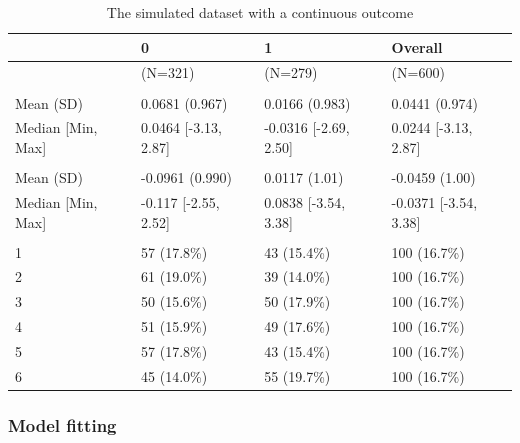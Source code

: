 \documentclass[
  letterpaper,
  DIV=11,
  numbers=noendperiod]{scrreprt}
\begin{document}
\hypertarget{tbl-summary-continuous_outcome-data}{}
\begin{table}
\caption{\label{tbl-summary-continuous_outcome-data}The simulated dataset with a continuous outcome }\tabularnewline

\centering
\begin{tabular}[t]{llll}
\toprule
  & 0 & 1 & Overall\\
\midrule
 & (N=321) & (N=279) & (N=600)\\
\addlinespace[0.3em]
\multicolumn{4}{l}{\textbf{z1}}\\
\hspace{1em}Mean (SD) & 0.0681 (0.967) & 0.0166 (0.983) & 0.0441 (0.974)\\
\hspace{1em}Median [Min, Max] & 0.0464 [-3.13, 2.87] & -0.0316 [-2.69, 2.50] & 0.0244 [-3.13, 2.87]\\
\addlinespace[0.3em]
\multicolumn{4}{l}{\textbf{z2}}\\
\hspace{1em}Mean (SD) & -0.0961 (0.990) & 0.0117 (1.01) & -0.0459 (1.00)\\
\hspace{1em}Median [Min, Max] & -0.117 [-2.55, 2.52] & 0.0838 [-3.54, 3.38] & -0.0371 [-3.54, 3.38]\\
\addlinespace[0.3em]
\multicolumn{4}{l}{\textbf{studyid}}\\
\hspace{1em}1 & 57 (17.8\%) & 43 (15.4\%) & 100 (16.7\%)\\
\hspace{1em}2 & 61 (19.0\%) & 39 (14.0\%) & 100 (16.7\%)\\
\hspace{1em}3 & 50 (15.6\%) & 50 (17.9\%) & 100 (16.7\%)\\
\hspace{1em}4 & 51 (15.9\%) & 49 (17.6\%) & 100 (16.7\%)\\
\hspace{1em}5 & 57 (17.8\%) & 43 (15.4\%) & 100 (16.7\%)\\
\hspace{1em}6 & 45 (14.0\%) & 55 (19.7\%) & 100 (16.7\%)\\
\bottomrule
\end{tabular}
\end{table}

\hypertarget{model-fitting}{%
\subsubsection{Model fitting}\label{model-fitting}}
\end{document}
